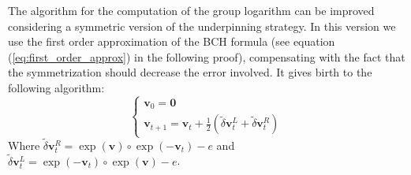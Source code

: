 The algorithm for the computation of the group logarithm can be improved considering a symmetric version of the underpinning strategy. In this version we use the first order approximation of the BCH formula (see equation (\ref{eq:first_order_approx}) in the following proof), compensating with the fact that the symmetrization should decrease the error involved.
It gives birth to the following algorithm:
\begin{equation}\label{eq:sym_strategy}
\begin{cases}
\mathbf{v}_0 = \mathbf{0} \\
\mathbf{v}_{t+1} = \mathbf{v}_{t} + \frac{1}{2}(\tilde{\delta} \mathbf{v}^{L}_{t} +\tilde{\delta} \mathbf{v}^{R}_{t})
\end{cases}
\end{equation}
Where $\tilde{\delta} \mathbf{v}^{R}_{t} = \exp(\mathbf{v})\circ \exp(- \mathbf{v}_{t}) - e$ and $\tilde{\delta} \mathbf{v}^{L}_{t} = \exp(-\mathbf{v}_{t})\circ \exp(\mathbf{v}) - e$.\\
